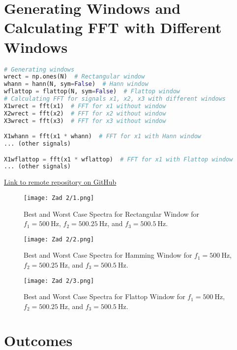 \documentclass[12pt]{article}
\begin{document}
\section*{Generating Windows and Calculating FFT with Different Windows}
\begin{lstlisting}[language=Python, breaklines=true]
# Generating windows
wrect = np.ones(N)  # Rectangular window
whann = hann(N, sym=False)  # Hann window
wflattop = flattop(N, sym=False)  # Flattop window
# Calculating FFT for signals x1, x2, x3 with different windows
X1wrect = fft(x1)  # FFT for x1 without window
X2wrect = fft(x2)  # FFT for x2 without window
X3wrect = fft(x3)  # FFT for x3 without window

X1whann = fft(x1 * whann)  # FFT for x1 with Hann window
... (other signals)

X1wflattop = fft(x1 * wflattop)  # FFT for x1 with Flattop window
... (other signals)
\end{lstlisting}
\item \href{https://github.com/DariaKrecichwostQA/StudiaUBB/tree/main/Digital%20Signal%20Processing/Zad1}{{Link to remote repository on GitHub}}

\begin{figure}[htbp]
\centering
\texttt{[image: Zad 2/1.png]} 
\caption{Best and Worst Case Spectra for Rectangular Window for \(f_1 = 500 \ \text{Hz}\), \(f_2 = 500.25 \ \text{Hz}\), and \(f_3 = 500.5 \ \text{Hz}\).}
\label{fig:best_worst_case_rect}
\end{figure}

\begin{figure}[htbp]
\centering
\texttt{[image: Zad 2/2.png]} 
\caption{Best and Worst Case Spectra for Hamming Window for \(f_1 = 500 \ \text{Hz}\), \(f_2 = 500.25 \ \text{Hz}\), and \(f_3 = 500.5 \ \text{Hz}\).}
\label{fig:best_worst_case_hann}
\end{figure}

\begin{figure}[htbp]
\centering
\texttt{[image: Zad 2/3.png]} 
\caption{Best and Worst Case Spectra for Flattop Window for \(f_1 = 500 \ \text{Hz}\), \(f_2 = 500.25 \ \text{Hz}\), and \(f_3 = 500.5 \ \text{Hz}\).}
\label{fig:best_worst_case_flattop}
\end{figure}

\FloatBarrier
\section{Outcomes}
\end{document}
